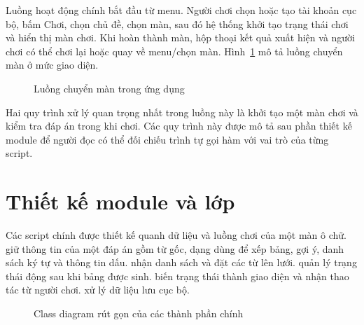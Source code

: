 \documentclass[../DoAn.tex]{subfiles}
\begin{document}
Luồng hoạt động chính bắt đầu từ menu. Người chơi chọn hoặc tạo tài khoản cục bộ, bấm Chơi, chọn chủ đề, chọn màn, sau đó hệ thống khởi tạo trạng thái chơi và hiển thị màn chơi. Khi hoàn thành màn, hộp thoại kết quả xuất hiện và người chơi có thể chơi lại hoặc quay về menu/chọn màn. Hình~\ref{fig:luong-chuyen-man} mô tả luồng chuyển màn ở mức giao diện.

\begin{figure}[H]
\centering
\resizebox{0.92\textwidth}{!}{}
\caption{Luồng chuyển màn trong ứng dụng}
\label{fig:luong-chuyen-man}
\end{figure}

Hai quy trình xử lý quan trọng nhất trong luồng này là khởi tạo một màn chơi và kiểm tra đáp án trong khi chơi. Các quy trình này được mô tả sau phần thiết kế module để người đọc có thể đối chiếu trình tự gọi hàm với vai trò của từng script.

\section{Thiết kế module và lớp}
\label{section:4.3}

Các script chính được thiết kế quanh dữ liệu và luồng chơi của một màn ô chữ.  giữ thông tin của một đáp án gồm từ gốc, dạng dùng để xếp bảng, gợi ý, danh sách ký tự và thông tin dấu.  nhận danh sách  và đặt các từ lên lưới.  quản lý trạng thái động sau khi bảng được sinh.  biến trạng thái thành giao diện và nhận thao tác từ người chơi.  xử lý dữ liệu lưu cục bộ.

\begin{figure}[H]
\centering
\resizebox{0.90\textwidth}{!}{}
\caption{Class diagram rút gọn của các thành phần chính}
\label{fig:class-diagram-rut-gon}
\end{figure}
\end{document}
